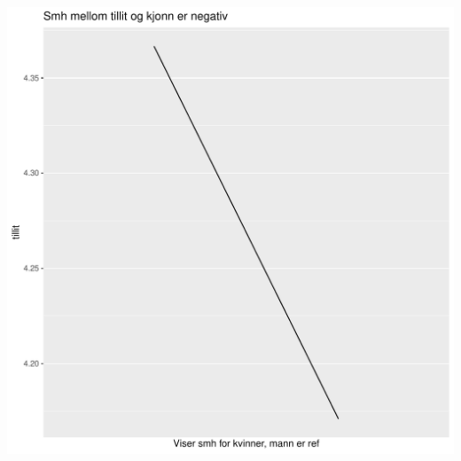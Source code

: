 \documentclass{article}\usepackage[]{graphicx}\usepackage[]{color}
\makeatletter
\def\maxwidth{ %
  \ifdim\Gin@nat@width>\linewidth
    \linewidth
  \else
    \Gin@nat@width
  \fi
}
\newenvironment{kframe}{%
 \def\at@end@of@kframe{}%
 \ifinner\ifhmode%
  \def\at@end@of@kframe{\end{minipage}}%
  \begin{minipage}{\columnwidth}%
 \fi\fi%
 \def\FrameCommand##1{\hskip\@totalleftmargin \hskip-\fboxsep
 \colorbox{shadecolor}{##1}\hskip-\fboxsep
     \hskip-\linewidth \hskip-\@totalleftmargin \hskip\columnwidth}%
 \MakeFramed {\advance\hsize-\width
   \@totalleftmargin\z@ \linewidth\hsize
   \@setminipage}}%
 {\par\unskip\endMakeFramed%
 \at@end@of@kframe}
\newenvironment{knitrout}{}{} %
\makeatother
\begin{document}
\begin{knitrout}
\begin{kframe}
\end{kframe}
\includegraphics[width=\maxwidth]{figure/resultater_mod2-2} 

\end{knitrout}
\end{document}
